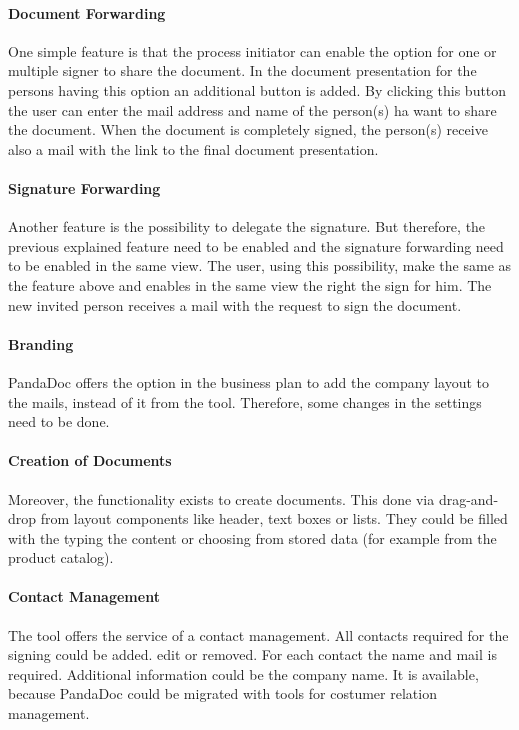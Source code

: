 \paragraph{Document Forwarding}
One simple feature is that the process initiator can enable the option for one or multiple signer to share the document. In the document presentation for the persons having this option an additional button is added. By clicking this button the user can enter the mail address and name of the person(s) ha want to share the document. When the document is completely signed, the person(s) receive also a mail with the link to the final document presentation. 

\paragraph{Signature Forwarding}
Another feature is the possibility to delegate the signature. But therefore, the previous explained feature need to be enabled and the signature forwarding need to be enabled in the same view. The user, using this possibility, make the same as the feature above and enables in the same view the right the sign for him. The new invited person receives a mail with the request to sign the document.

\paragraph{Branding}
PandaDoc offers the option in the business plan to add the company layout to the mails, instead of it from the tool. Therefore, some changes in the settings need to be done. 

\paragraph{Creation of Documents}
Moreover, the functionality exists to create documents. This done via drag-and-drop from layout components like header, text boxes or lists. They could be filled with the typing the content or choosing from stored data (for example from the product catalog).

\paragraph{Contact Management}
The tool offers the service of a contact management. All contacts required for the signing could be added. edit or removed. For each contact the name and mail is required. Additional information could be the company name. It is available, because PandaDoc could be migrated with tools for costumer relation management.

